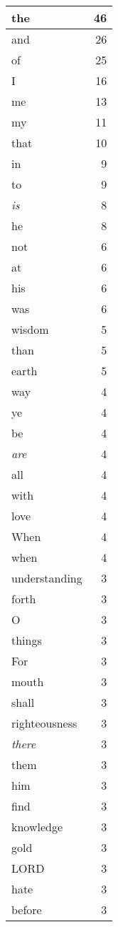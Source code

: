 \begin{center}
\begin{longtable}{l|r}
the & 46\\ \hline 
and & 26\\ \hline 
of & 25\\ \hline 
I & 16\\ \hline 
me & 13\\ \hline 
my & 11\\ \hline 
that & 10\\ \hline 
in & 9\\ \hline 
to & 9\\ \hline 
\emph{is} & 8\\ \hline 
he & 8\\ \hline 
not & 6\\ \hline 
at & 6\\ \hline 
his & 6\\ \hline 
was & 6\\ \hline 
wisdom & 5\\ \hline 
than & 5\\ \hline 
earth & 5\\ \hline 
way & 4\\ \hline 
ye & 4\\ \hline 
be & 4\\ \hline 
\emph{are} & 4\\ \hline 
all & 4\\ \hline 
with & 4\\ \hline 
love & 4\\ \hline 
When & 4\\ \hline 
when & 4\\ \hline 
understanding & 3\\ \hline 
forth & 3\\ \hline 
O & 3\\ \hline 
things & 3\\ \hline 
For & 3\\ \hline 
mouth & 3\\ \hline 
shall & 3\\ \hline 
righteousness & 3\\ \hline 
\emph{there} & 3\\ \hline 
them & 3\\ \hline 
him & 3\\ \hline 
find & 3\\ \hline 
knowledge & 3\\ \hline 
gold & 3\\ \hline 
LORD & 3\\ \hline 
hate & 3\\ \hline 
before & 3\\ \hline 

\end{longtable}
\end{center}
